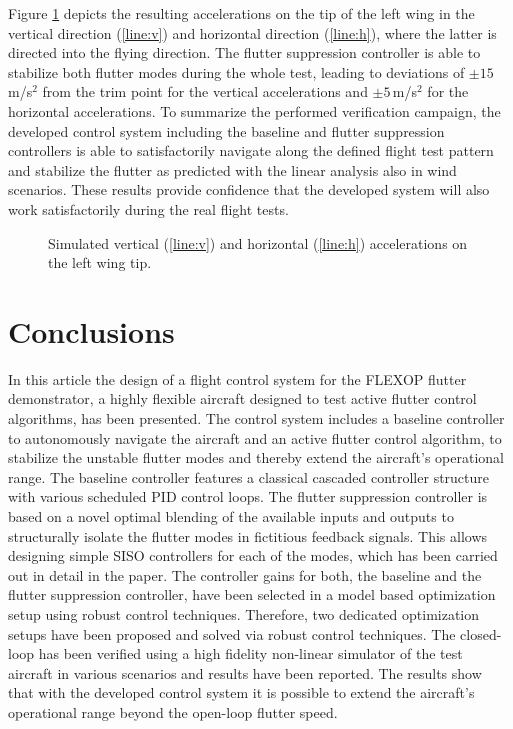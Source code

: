 \documentclass[aerospace,article,submit,moreauthors,pdftex,10pt,a4paper]{Definitions/mdpi}
\begin{document}
Figure \ref{fig:d1_patt_acc} depicts the resulting accelerations on the tip of the left wing in the vertical direction (\ref{line:v}) and horizontal direction (\ref{line:h}), where the latter is directed into the flying direction. The flutter suppression controller is able to stabilize both flutter modes during the whole test, leading to deviations of $\pm15$\,m/s$^2$ from the trim point for the vertical accelerations and $\pm5$\,m/s$^2$ for the horizontal accelerations. To summarize the performed verification campaign, the developed control system including the baseline and flutter suppression controllers is able to satisfactorily navigate along the defined flight test pattern  and stabilize the flutter as predicted with the linear analysis also in wind scenarios. These results provide confidence that the developed system will also work satisfactorily during the real flight tests.



\begin{figure}[h]
	\centering
	
	\caption{Simulated vertical (\ref{line:v}) and horizontal (\ref{line:h}) accelerations on the left wing tip.}
	\label{fig:d1_patt_acc}	
\end{figure}



\section{Conclusions}
In this article the design of a  flight control system for the FLEXOP flutter demonstrator, a highly flexible aircraft designed to test active flutter control algorithms, has been presented. The control system includes a baseline controller to autonomously navigate the aircraft and an active flutter control algorithm, to stabilize the unstable flutter modes and thereby extend the aircraft's operational range.
The baseline controller features a classical cascaded controller structure with various scheduled PID control loops. The flutter suppression controller is based on a novel optimal blending of the available inputs and outputs to structurally isolate the flutter modes in fictitious feedback signals. This allows designing simple SISO controllers for each of the modes, which has been carried out in detail in the paper. The controller gains for both, the baseline and the flutter suppression controller, have been selected in a model based optimization setup using robust control techniques. Therefore, two dedicated optimization setups have been proposed and solved via robust control techniques. The closed-loop has been verified using a high fidelity non-linear simulator of the test aircraft in various scenarios and results have been reported. The results show that with the developed control system it is possible to extend the aircraft's operational range beyond the open-loop flutter speed.
\end{document}
